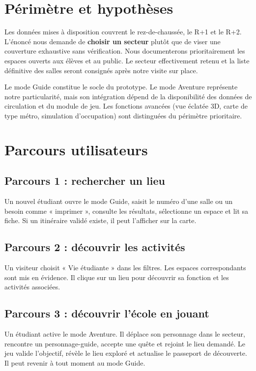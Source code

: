 \documentclass[11pt,a4paper]{article}
\begin{document}
\section{Périmètre et hypothèses}
Les données mises à disposition couvrent le rez-de-chaussée, le R+1 et le R+2. L'énoncé nous demande de \textbf{choisir un secteur} plutôt que de viser une couverture exhaustive sans vérification. Nous documenterons prioritairement les espaces ouverts aux élèves et au public. Le secteur effectivement retenu et la liste définitive des salles seront consignés après notre visite sur place.

Le mode Guide constitue le socle du prototype. Le mode Aventure représente notre particularité, mais son intégration dépend de la disponibilité des données de circulation et du module de jeu. Les fonctions avancées (vue éclatée 3D, carte de type métro, simulation d'occupation) sont distinguées du périmètre prioritaire.

\section{Parcours utilisateurs}
\subsection{Parcours 1 : rechercher un lieu}
Un nouvel étudiant ouvre le mode Guide, saisit le numéro d'une salle ou un besoin comme « imprimer », consulte les résultats, sélectionne un espace et lit sa fiche. Si un itinéraire validé existe, il peut l'afficher sur la carte.

\subsection{Parcours 2 : découvrir les activités}
Un visiteur choisit « Vie étudiante » dans les filtres. Les espaces correspondants sont mis en évidence. Il clique sur un lieu pour découvrir sa fonction et les activités associées.

\subsection{Parcours 3 : découvrir l'école en jouant}
Un étudiant active le mode Aventure. Il déplace son personnage dans le secteur, rencontre un personnage-guide, accepte une quête et rejoint le lieu demandé. Le jeu valide l'objectif, révèle le lieu exploré et actualise le passeport de découverte. Il peut revenir à tout moment au mode Guide.
\end{document}

